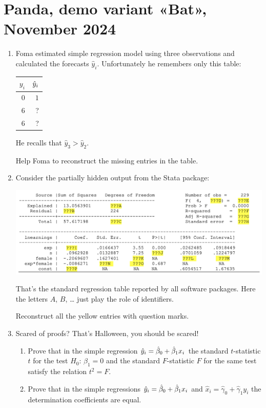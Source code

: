 \section{Panda, demo variant «Bat», November 2024}
\begin{enumerate}
    \item %
    Foma estimated simple regression model using three observations and calculated the forecasts $\hat{y}_i$. 
    Unfortunately he remembers only this table:

    \begin{tabular}{rr}
    \toprule
    $y_i$ & $\hat{y}_i$ \\
    \midrule
    $0$ & $1$ \\
    $6$ & ? \\
    $6$ & ? \\
    \bottomrule
    \end{tabular}
    
    He recalls that $\hat y_3 > \hat y_2$. 
    
    Help Foma to reconstruct the missing entries in the table. 
    
    \item Consider the partially hidden output from the Stata package:
    
    \begin{minipage}{\textwidth}
        \includegraphics[scale=0.6]{figures/partial_stata_table.png}
    \end{minipage}

    That's the standard regression table reported by all software packages. 
    Here the letters $A$, $B$, \dots{ } just play the role of identifiers. 
    
    Reconstruct all the yellow entries with question marks. 
    

    \item Scared of proofs? That's Halloween, you should be scared!
    \begin{enumerate}
        \item Prove that in the simple regression $\hat y_i = \hat{\beta}_0 + \hat{\beta}_1 x_i$ the 
        standard $t$-statistic $t$ for the test $H_0$: $\beta_1 = 0$ and 
        the standard $F$-statistic $F$ for the same test satisfy the relation $t^2 = F$.
        \item Prove that in the simple regressions $\hat y_i = \hat{\beta}_0 + \hat{\beta}_1 x_i$ and 
        $\hat x_i = \hat{\gamma}_0 + \hat{\gamma}_1 y_i$ the determination coefficients are equal. 
    \end{enumerate}



\end{enumerate}
